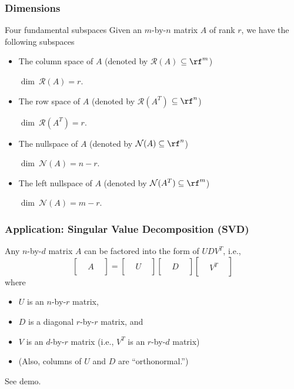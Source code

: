 \begin{frame}
  \frametitle{Dimensions}

  \begin{block}{Four fundamental subspaces}
    Given an $m$-by-$n$ matrix $A$ of rank $r$, we have the following
    subspaces
    \begin{itemize}
    \item The column space of $A$ (denoted by ${\mathcal R}(A)$
      {$\subseteq \rf^m$})

      $\dim~{\mathcal R}(A) = r$.
    \item The row space of $A$ (denoted by ${\mathcal R}(A^T)$
      {$\subseteq \rf^n$})

      $\dim~{\mathcal R}(A^T) = r$.
    \item The nullspace of $A$ (denoted by ${\mathcal N}(A) \subseteq \rf^n$)

      $\dim~{\mathcal N}(A) = n-r$.
    \item The left nullspace of $A$ (denoted by ${\mathcal N}(A^T) \subseteq \rf^m$)

      $\dim~{\mathcal N}(A) = m-r$.
    \end{itemize}
  \end{block}
\end{frame}

\begin{frame}
  \frametitle{Application: Singular Value Decomposition (SVD)}

  Any $n$-by-$d$ matrix $A$ can be factored into the form of $UDV^T$, i.e.,
  \[
  \begin{bmatrix}
    & & \\
    & A & \\
    & &
  \end{bmatrix} =
  \begin{bmatrix}
    & & \\
    & U & \\
    & &
  \end{bmatrix} 
  \begin{bmatrix}
    & & \\
    & D & \\
    & &
  \end{bmatrix} 
  \begin{bmatrix}
    & & \\
    & V^T & \\
    & &
  \end{bmatrix} 
  \]
  where
  \begin{itemize}
  \item $U$ is an $n$-by-$r$ matrix,
  \item $D$ is a diagonal $r$-by-$r$ matrix, and
  \item $V$ is an $d$-by-$r$ matrix (i.e., $V^T$ is an $r$-by-$d$ matrix)
  \item (Also, columns of $U$ and $D$ are ``orthonormal.'')
  \end{itemize}

  \vspace{0.5in}
  See demo.
\end{frame}

